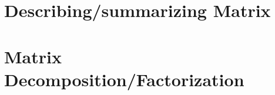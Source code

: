 \section{Describing/summarizing Matrix}







\section{Matrix Decomposition/Factorization}
















